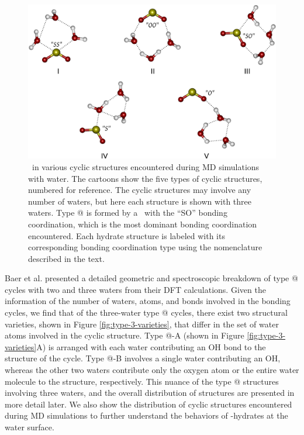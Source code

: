 \documentclass{article}
\makeatletter
\newcommand{\Rmnum}[1]{\expandafter\@slowromancap\romannumeral #1@}
\makeatother
\begin{document}
\begin{figure}[h!]
	\begin{center}
		\includegraphics[scale=1.0]{cycle-types-small.png}
		\caption{\suldiox~in various cyclic structures encountered during MD simulations with water. The cartoons show the five types of cyclic structures, numbered for reference. The cyclic structures may involve any number of waters, but here each structure is shown with three waters. Type \Rmnum{3} is formed by a \suldiox~with the ``SO'' bonding coordination, which is the most dominant bonding coordination encountered. Each hydrate structure is labeled with its corresponding bonding coordination type using the nomenclature described in the text.}
		\label{fig:cyclic-structures}
	\end{center}
\end{figure}

Baer et al. presented a detailed geometric and spectroscopic breakdown of type \Rmnum{3} cycles with two and three waters from their DFT calculations.\cite{Baer2010} Given the information of the number of waters, atoms, and bonds involved in the bonding cycles, we find that of the three-water type \Rmnum{3} cycles, there exist two structural varieties, shown in Figure \ref{fig:type-3-varieties}, that differ in the set of water atoms involved in the cyclic structure. Type \Rmnum{3}-A (shown in Figure \ref{fig:type-3-varieties}A) is arranged with each water contributing an OH bond to the structure of the cycle. Type \Rmnum{3}-B involves a single water contributing an OH, whereas the other two waters contribute only the oxygen atom or the entire water molecule to the structure, respectively. This nuance of the type \Rmnum{3} structures involving three waters, and the overall distribution of structures are presented in more detail later. We also show the distribution of cyclic structures encountered during MD simulations to further understand the behaviors of \suldiox-hydrates at the water surface.
\end{document}
